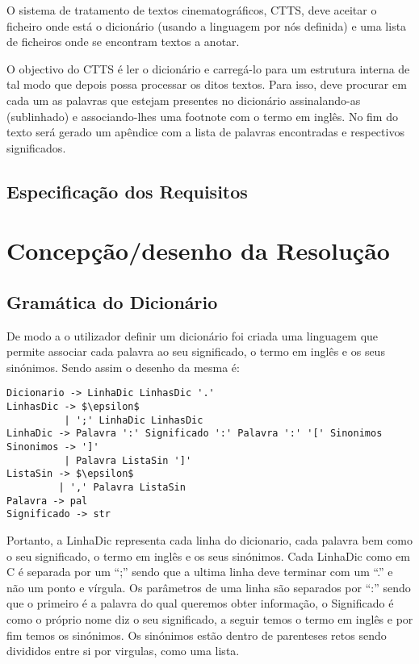 \documentclass{llncs}
\begin{document}
O sistema de tratamento de textos cinematográficos, CTTS, deve aceitar o ficheiro onde está o dicionário (usando a linguagem por nós definida) e uma lista de ficheiros onde se encontram textos a anotar.

O objectivo do CTTS é ler o dicionário e carregá-lo para um estrutura interna de tal modo que depois possa processar os ditos textos. Para isso, deve procurar em cada um as palavras que estejam presentes no dicionário assinalando-as (sublinhado) e associando-lhes uma footnote com o termo em inglês. No fim do texto será gerado um apêndice com a lista de palavras encontradas e respectivos significados.

\subsection{Especificação dos Requisitos}

\section{Concepção/desenho da Resolução}

\subsection{Gramática do Dicionário}
De modo a o utilizador definir um dicionário foi criada uma linguagem que permite associar cada palavra ao seu significado, o termo em inglês e os seus sinónimos. Sendo assim o desenho da mesma é:
\begin{lstlisting}[mathescape]
Dicionario -> LinhaDic LinhasDic '.' 
LinhasDic -> $\epsilon$ 
          | ';' LinhaDic LinhasDic 
LinhaDic -> Palavra ':' Significado ':' Palavra ':' '[' Sinonimos 
Sinonimos -> ']' 
          | Palavra ListaSin ']' 
ListaSin -> $\epsilon$ 
         | ',' Palavra ListaSin 
Palavra -> pal 
Significado -> str 
\end{lstlisting}
Portanto, a LinhaDic representa cada linha do dicionario, cada palavra bem como o seu significado, o termo em inglês e os seus sinónimos. Cada LinhaDic como em C é separada por um ``;'' sendo que a ultima linha deve terminar com um ``.'' e não um ponto e vírgula. Os parâmetros de uma linha são separados por ``:'' sendo que o primeiro é a palavra do qual queremos obter informação, o Significado é como o próprio nome diz o seu significado, a seguir temos o termo em inglês e por fim temos os sinónimos. Os sinónimos estão dentro de parenteses retos sendo divididos entre si por virgulas, como uma lista.
\end{document}
